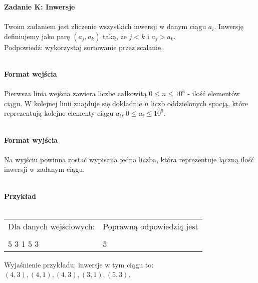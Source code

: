 \documentclass[
  fontsize=12pt  %
 ,english        %
 ,headinclude    %
 ,headsepline    %
]{scrbook}       %
\begin{document}
\vspace{50 mm}
\hspace{50 mm}
\newline

\par{\Large \textbf{Zadanie K: Inwersje}} \\ \\
Twoim zadaniem jest zliczenie wszystkich inwersji w danym ciągu $a_i$. Inwersję definiujemy jako parę $(a_j, a_k)$ taką, że $j < k$ i $a_j > a_k$.
\\
Podpowiedź: wykorzystaj sortowanie przez scalanie.
\\ \\
\par{\Large \textbf{Format wejścia}} \\ \\
Pierwsza linia wejścia zawiera liczbe całkowitą $0 \leq n \leq 10^6$ - ilość elementów ciągu. W kolejnej linii znajduje się dokładnie $n$ liczb oddzielonych spacją, które reprezentują kolejne elementy ciągu $a_i$, $0 \leq a_i \leq 10^9$.
\\ \\
\par{\Large \textbf{Format wyjścia}} \\ \\
Na wyjściu powinna zostać wypisana jedna liczba, która reprezentuje łączną ilość inwersji w zadanym ciągu.
\\ \\
\par{\Large \textbf{Przykład}} \\ \\
\begin{tabular}{ p{7cm} p{7cm} }

  Dla danych wejściowych: \hspace{40mm}& Poprawną odpowiedzią jest \\
& \\

5 \newline
4 3 1 5 3 \newline

&   
5 \newline

\end{tabular}

Wyjaśnienie przykładu: inwersje w tym ciągu to: $(4,3), (4,1), (4,3), (3,1), (5,3)$.
\end{document}
